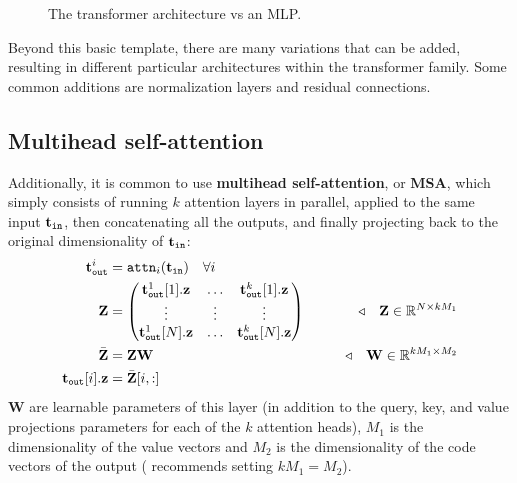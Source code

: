 \begin{figure}[h]
{\begin{minipage}{.49\linewidth}
\end{minipage}
}
\caption{The transformer architecture vs an MLP.}
\end{figure}

Beyond this basic template, there are many variations that can be added, resulting in different particular architectures within the transformer family. Some common additions are normalization layers and residual connections. 

\subsection{Multihead self-attention}
Additionally, it is common to use \textbf{multihead self-attention}, or \textbf{MSA}, which simply consists of running $k$ attention layers in parallel, applied to the same input $\mathbf{t}_{\texttt{in}}$, then concatenating all the outputs, and finally projecting back to the original dimensionality of $\mathbf{t}_{\texttt{in}}$:
\begin{align}
    \mathbf{t}_{\texttt{out}}^i &= \texttt{attn}_i(\mathbf{t}_{\texttt{in}}) \quad \forall i\\
    \mathbf{Z} &= \begin{pmatrix}
        \mathbf{t}_{\texttt{out}}^1[1].\mathbf{z} & \ldots & \mathbf{t}_{\texttt{out}}^k[1].\mathbf{z}\\
        \vdots & \vdots & \vdots \\
        \mathbf{t}_{\texttt{out}}^1[N].\mathbf{z} & \ldots & \mathbf{t}_{\texttt{out}}^k[N].\mathbf{z}\\
    \end{pmatrix} &\quad\quad \triangleleft \quad \mathbf{Z} \in \mathbb{R}^{N \times kM_1}\\
    \bar{\mathbf{Z}} &= \mathbf{Z}\mathbf{W} &\quad\quad \triangleleft \quad \mathbf{W} \in \mathbb{R}^{kM_1 \times M_2} \label{eqn:transformers:MSH}\\
    \mathbf{t}_{\texttt{out}}[i].\mathbf{z} &= \bar{\mathbf{Z}}[i,:]
\end{align}
$\mathbf{W}$ are learnable parameters of this layer (in addition to the query, key, and value projections parameters for each of the $k$ attention heads), $M_1$ is the dimensionality of the value vectors and $M_2$ is the dimensionality of the code vectors of the output (\cite{dosovitskiy2020vit} recommends setting $kM_1 = M_2$).

